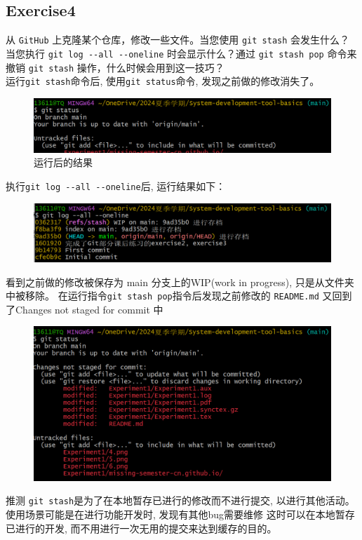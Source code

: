 \documentclass{article}
\begin{document}
        \subsection{Exercise4}
        从 \verb|GitHub| 上克隆某个仓库，修改一些文件。当您使用 \verb|git stash| 会发生什么？当您执行
        \verb|git log --all --oneline| 时会显示什么？通过 \verb|git stash pop| 命令来撤销
        \verb|git stash| 操作，什么时候会用到这一技巧？\\
        运行\verb|git stash|命令后, 使用\verb|git status|命令, 发现之前做的修改消失了。
        \begin{figure}[H]
            \centering
            \includegraphics[scale=0.7]{4.png}
            \caption{运行后的结果}
        \end{figure}
        执行\verb|git log --all --oneline|后, 运行结果如下：
        \begin{figure}[H]
            \centering
            \includegraphics[scale=0.7]{5.png}
        \end{figure}
        看到之前做的修改被保存为 main 分支上的WIP(work in progress), 只是从文件夹中被移除。
        在运行指令\verb|git stash pop|指令后发现之前修改的 \verb|README.md| 
        又回到了Changes not staged for commit 中
        \begin{figure}[H]
            \centering
            \includegraphics[scale=0.8]{6.png}
        \end{figure}
        推测 \verb|git stash|是为了在本地暂存已进行的修改而不进行提交, 
        以进行其他活动。使用场景可能是在进行功能开发时, 发现有其他bug需要维修
        这时可以在本地暂存已进行的开发, 而不用进行一次无用的提交来达到缓存的目的。
\end{document}
